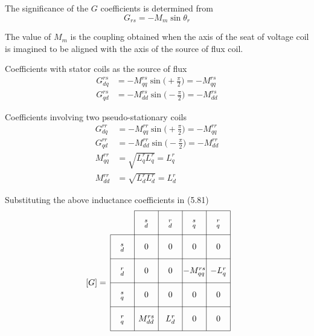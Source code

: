 \documentclass[a4paper,numbers=noenddot,12pt]{scrbook}
\begin{document}
        The significance of the $G$ coefficients is determined from
        \begin{equation*}
            G_{rs} = -M_m \sin \theta_r
        \end{equation*}

        The value of $M_m$ is the coupling obtained when the axis of the seat of voltage coil is imagined to be aligned with the axis of the source of flux coil.

        Coefficients with stator coils as the source of flux
        \begin{align*}
            G_{dq}^{rs} &= - M_{qq}^{rs} \sin \Big (+\frac{\pi}{2}\Big) = -M_{qq}^{rs}\\
            G_{qd}^{rs} &= - M_{dd}^{rs} \sin \Big (-\frac{\pi}{2}\Big) = -M_{dd}^{rs}
        \end{align*}

        Coefficients involving two pseudo-stationary coils 
        \begin{align*}
            G_{dq}^{rr} & =-M_{qq}^{rr} \sin \Big( +\frac{\pi}{2} \Big) = -M_{qq}^{rr}\\
            G_{qd}^{rr} & =-M_{dd}^{rr} \sin \Big( -\frac{\pi}{2} \Big) = -M_{dd}^{rr}\\
            M_{qq}^{rr} & = \sqrt{L_q^r L_q^r} = L_q^r \\
            M_{dd}^{rr} & = \sqrt{L_d^r L_d^r} = L_d^r
        \end{align*}

        Substituting the above inductance coefficients in (5.81)
        \begin{equation}
            \begin{tikzpicture} [anchor = base, baseline =0pt]
                \draw (0,0)--(5,0) (0,1)--(5,1) (0,2)--(5,2) (1,3)--(5,3) (0,-1)--(5,-1) (0,-2)--(5,-2);
                \draw (0,-2)--(0,2) (1,-2)--(1,3) (2,-2)--(2,3) (3,-2)--(3,3) (4,-2)--(4,3) (5,-2)--(5,3);
                \draw (0.5,-1.6) node{$_q^r$} +(0,1) node{$_q^s$} +(0,2) node{$_d^r$} +(0,3) node{$_d^s$};
                \draw (1.5,-1.6) node{$M_{dd}^{rs}$} +(0,1) node{0} +(0,2) node{0} +(0,3) node{0}+(0,4) node{$_d^s$};
                \draw (2.5,-1.6) node{$L_{d}^{r}$} +(0,1) node{0} +(0,2) node{0} +(0,3) node{0}+(0,4) node{$_d^r$};
                \draw (3.5,-1.6) node{0} +(0,1) node{0} +(0,2) node{$-M_{qq}^{rs}$} +(0,3) node{0}+(0,4) node{$_q^s$};
                \draw (4.5,-1.6) node{0} +(0,1) node{0} +(0,2) node{$-L_{q}^{r}$} +(0,3) node{0}+(0,4) node{$_q^r$};
                \draw (-0.6,-0.1) node{$[G] =$};
            \end{tikzpicture}
        \end{equation}
\end{document}
